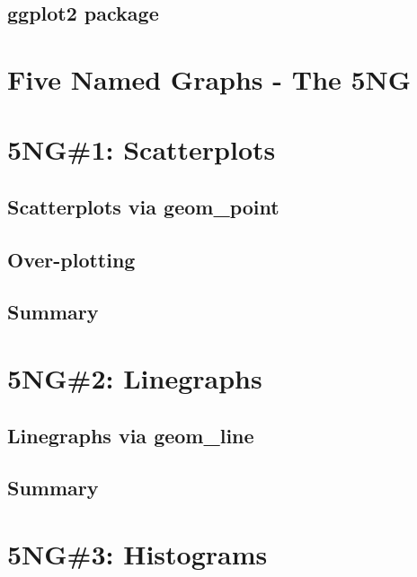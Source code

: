 \documentclass[12pt, krantz2,]{krantz}
\begin{document}
\hypertarget{ggplot2-package}{%
\subsection{ggplot2 package}\label{ggplot2-package}}

\hypertarget{FiveNG}{%
\section{Five Named Graphs - The 5NG}\label{FiveNG}}

\hypertarget{scatterplots}{%
\section{5NG\#1: Scatterplots}\label{scatterplots}}

\hypertarget{geompoint}{%
\subsection{Scatterplots via geom\_point}\label{geompoint}}

\hypertarget{overplotting}{%
\subsection{Over-plotting}\label{overplotting}}

\hypertarget{summary}{%
\subsection{Summary}\label{summary}}

\hypertarget{linegraphs}{%
\section{5NG\#2: Linegraphs}\label{linegraphs}}

\hypertarget{geomline}{%
\subsection{Linegraphs via geom\_line}\label{geomline}}

\hypertarget{summary-1}{%
\subsection{Summary}\label{summary-1}}

\hypertarget{histograms}{%
\section{5NG\#3: Histograms}\label{histograms}}
\end{document}
